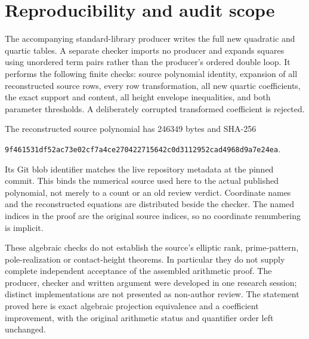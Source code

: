 \documentclass[11pt,a4paper]{article}
\begin{document}
\section{Reproducibility and audit scope}
The accompanying standard-library producer writes the full new quadratic
and quartic tables. A separate checker imports no producer and expands
squares using unordered term pairs rather than the producer's ordered
double loop. It performs the following finite checks: source polynomial
identity, expansion of all reconstructed source rows, every row transformation,
all new quartic coefficients, the exact support and content, all height
envelope inequalities, and both parameter thresholds. A deliberately
corrupted transformed coefficient is rejected.

The reconstructed source polynomial has 246349 bytes and SHA-256
\begin{center}\small
\nolinkurl{9f461531df52ac73e02cf7a4ce270422715642c0d3112952cad4968d9a7e24ea}.
\end{center}
Its Git blob identifier matches the live repository metadata at the pinned
commit. This binds the numerical source used here to the actual published
polynomial, not merely to a count or an old review verdict. Coordinate
names and the reconstructed equations are distributed beside the checker.
The named indices in the proof are the original source indices, so no
coordinate renumbering is implicit.

These algebraic checks do not establish the source's elliptic rank,
prime-pattern, pole-realization or contact-height theorems. In particular
they do not supply complete independent acceptance of the assembled
arithmetic proof. The producer, checker and written argument were developed
in one research session; distinct implementations are not presented as
non-author review. The statement proved here is exact algebraic
projection equivalence and a coefficient improvement, with the original
arithmetic status and quantifier order left unchanged.
\end{document}
